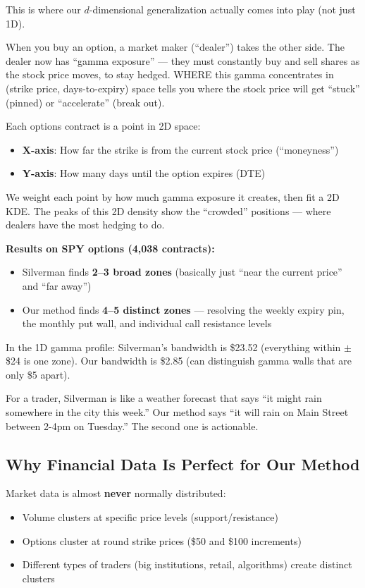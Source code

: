 \documentclass[12pt]{article}
\newcommand{\analogy}[1]{\begin{tcolorbox}[colback=green!5,colframe=green!50!black,title=Analogy]\small #1\end{tcolorbox}}
\newcommand{\whythis}[1]{\begin{tcolorbox}[colback=orange!5,colframe=orange!50!black,title=Why do we need this?]\small #1\end{tcolorbox}}
\begin{document}
This is where our $d$-dimensional generalization actually comes into play (not just 1D).

\whythis{When you buy an option, a market maker (``dealer'') takes the other side. The dealer now has ``gamma exposure'' --- they must constantly buy and sell shares as the stock price moves, to stay hedged. WHERE this gamma concentrates in (strike price, days-to-expiry) space tells you where the stock price will get ``stuck'' (pinned) or ``accelerate'' (break out).}

Each options contract is a point in 2D space:
\begin{itemize}
\item \textbf{X-axis}: How far the strike is from the current stock price (``moneyness'')
\item \textbf{Y-axis}: How many days until the option expires (DTE)
\end{itemize}

We weight each point by how much gamma exposure it creates, then fit a 2D KDE. The peaks of this 2D density show the ``crowded'' positions --- where dealers have the most hedging to do.

\textbf{Results on SPY options (4,038 contracts):}
\begin{itemize}
\item Silverman finds \textbf{2--3 broad zones} (basically just ``near the current price'' and ``far away'')
\item Our method finds \textbf{4--5 distinct zones} --- resolving the weekly expiry pin, the monthly put wall, and individual call resistance levels
\end{itemize}

In the 1D gamma profile: Silverman's bandwidth is \$23.52 (everything within $\pm$\$24 is one zone). Our bandwidth is \$2.85 (can distinguish gamma walls that are only \$5 apart).

\analogy{For a trader, Silverman is like a weather forecast that says ``it might rain somewhere in the city this week.'' Our method says ``it will rain on Main Street between 2-4pm on Tuesday.'' The second one is actionable.}

\subsection{Why Financial Data Is Perfect for Our Method}

Market data is almost \textbf{never} normally distributed:
\begin{itemize}
\item Volume clusters at specific price levels (support/resistance)
\item Options cluster at round strike prices (\$50 and \$100 increments)
\item Different types of traders (big institutions, retail, algorithms) create distinct clusters
\end{itemize}
\end{document}
